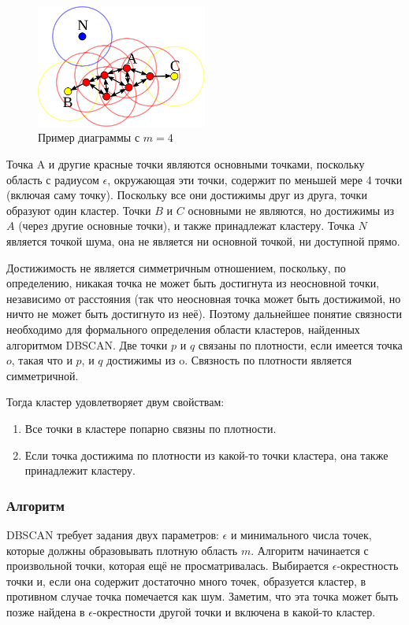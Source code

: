 \documentclass[bachelor, och, referat]{SCWorks}
\begin{document}
\begin{figure}[H]
    \centering
    \includegraphics[width=0.5\textwidth]{5.png}
    \caption{Пример диаграммы с $m = 4$}
\end{figure}

Точка A и другие красные точки являются основными точками, поскольку область с радиусом 
$\epsilon$, окружающая эти точки, содержит по меньшей мере 4 точки (включая саму точку). Поскольку все они достижимы друг из друга, точки образуют один кластер. Точки $B$ и $C$ основными не являются, но достижимы из $A$ (через другие основные точки), и также принадлежат кластеру. Точка $N$ является точкой шума, она не является ни основной точкой, ни доступной прямо.

Достижимость не является симметричным отношением, поскольку, по определению, никакая точка не может быть достигнута из неосновной точки, независимо от расстояния (так что неосновная точка может быть достижимой, но ничто не может быть достигнуто из неё). Поэтому дальнейшее понятие связности необходимо для формального определения области кластеров, найденных алгоритмом DBSCAN. Две точки $p$ и $q$ связаны по плотности, если имеется точка $o$, такая что и $p$, и $q$ достижимы из o. Связность по плотности является симметричной.

Тогда кластер удовлетворяет двум свойствам:

\begin{enumerate}
    \item Все точки в кластере попарно связны по плотности.
    \item Если точка достижима по плотности из какой-то точки кластера, она также принадлежит кластеру.
\end{enumerate}

\subsubsection{Алгоритм}
DBSCAN требует задания двух параметров: 
$\epsilon$ и минимального числа точек, которые должны образовывать плотную область $m$. Алгоритм начинается с произвольной точки, которая ещё не просматривалась. Выбирается 
$\epsilon$-окрестность точки и, если она содержит достаточно много точек, образуется кластер, в противном случае точка помечается как шум. Заметим, что эта точка может быть позже найдена в 
$\epsilon$-окрестности другой точки и включена в какой-то кластер.
\end{document}
